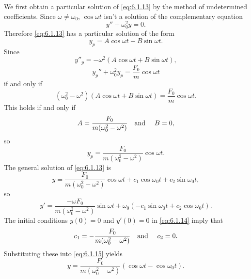 \begin{examplesolution}
\solution We first obtain a particular solution of \eqref{eq:6.1.13} by the method of undetermined
coefficients. Since $\omega\ne\omega_{0}$, $\cos\omega t$ isn't a solution of the complementary
equation
\[
  y''+\omega_{0}^{2}y=0.
\]
Therefore \eqref{eq:6.1.13} has a particular solution of the form
\[
  y_{p}=A\cos\omega t+B\sin\omega t.
\]
Since
\[
  y''_{p}=-\omega^{2}(A\cos\omega t+B\sin\omega t),
\]
\[
  y_{p}''+\omega_{0}^{2}y_{p}=\frac{F_{0}}{m}\cos\omega t
\]
if and only if
\[
  (\omega_{0}^{2}-\omega^{2})\left(A\cos\omega t+ B\sin\omega t\right)=\frac{F_{0}}{m}\cos\omega t.
\]
This holds if and only if
\[
  A=\frac{F_{0}}{m(\omega_{0}^{2}-\omega^{2})}\mbox{\quad and \quad}B=0,
\]
so
\[
  y_{p}=\frac{F_{0}}{m(\omega_{0}^{2}-\omega^{2})}\cos\omega t.
\]
The general solution of \eqref{eq:6.1.13} is
\begin{equation}
  \label{eq:6.1.15}y=\frac{F_{0}}{m(\omega_{0}^{2}-\omega^{2})}\cos\omega t +c_{1}\cos\omega_{0}t+c_{2}\sin\omega_{0}t,
\end{equation}
so
\[
  y'=\frac{-\omega F_{0}}{m(\omega_{0}^{2}-\omega^{2})}\sin\omega t +\omega_{0}(-c_{1}\sin\omega_{0}t+c_{2}\cos\omega_{0}t).
\]
The initial conditions $y(0)=0$ and $y'(0)=0$ in \eqref{eq:6.1.14} imply that
\[
  c_{1}=-\frac{F_{0}}{m(\omega_{0}^{2}-\omega^{2})}\mbox{\quad and \quad}c_{2}=0.
\]
Substituting these into \eqref{eq:6.1.15} yields
\begin{equation}
  \label{eq:6.1.16}y=\frac{F_{0}}{m(\omega_{0}^{2}-\omega^{2})}(\cos\omega t-\cos\omega_{0}t).
\end{equation}


\end{examplesolution}

